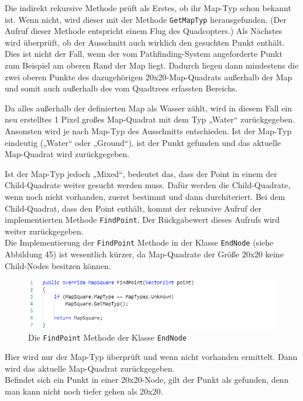 \documentclass[a4paper,12pt]{article}
\newcommand{\code}{\texttt}
\begin{document}
Die indirekt rekursive Methode prüft als Erstes, ob ihr Map-Typ schon bekannt ist. Wenn nicht, wird dieser mit der Methode \code{GetMapTyp} herausgefunden. (Der Aufruf dieser Methode entspricht einem Flug des Quadcopters.) Als Nächstes wird überprüft, ob der Ausschnitt auch wirklich den gesuchten Punkt enthält. Dies ist nicht der Fall, wenn der vom Pathfinding-System angeforderte Punkt zum Beispiel am oberen Rand der Map liegt. Dadurch liegen dann mindestens die zwei oberen Punkte des dazugehörigen 20x20-Map-Quadrats außerhalb der Map und somit auch außerhalb des vom Quadtrees erfassten Bereichs.

Da alles außerhalb der definierten Map als Wasser zählt, wird in diesem Fall ein neu erstelltes 1 Pixel großes Map-Quadrat mit dem Typ „Water“ zurückgegeben.
\\[0.4cm]
Ansonsten wird je nach Map-Typ des Ausschnitts entschieden. Ist der Map-Typ eindeutig („Water“ oder „Ground“), ist der Punkt gefunden und das aktuelle Map-Quadrat wird zurückgegeben.

Ist der Map-Typ jedoch „Mixed“, bedeutet das, dass der Point in einem der Child-Quadrate weiter gesucht werden muss. Dafür werden die Child-Quadrate, wenn noch nicht vorhanden, zuerst bestimmt und dann durchiteriert. Bei dem Child-Quadrat, dass den Point enthält, kommt der rekursive Aufruf der implementierten Methode \code{FindPoint}. Der Rückgabewert dieses Aufrufs wird weiter zurückgegeben.
\\[0.4cm]
Die Implementierung der \code{FindPoint} Methode in der Klasse \code{EndNode} (siehe Abbildung 45) ist wesentlich kürzer, da Map-Quadrate der Größe 20x20 keine Child-Nodes besitzen können.

\begin{figure}[H]
    \centering
    \includegraphics[width=1\linewidth]{Bilder/Aufgabe3/Quadtree_03.png}
    \caption{Die \code{FindPoint} Methode der Klasse \code{EndNode}}
\end{figure}

Hier wird nur der Map-Typ überprüft und wenn nicht vorhanden ermittelt. Dann wird das aktuelle Map-Quadrat zurückgegeben.
\\[0.4cm]
Befindet sich ein Punkt in einer 20x20-Node, gilt der Punkt als gefunden, denn man kann nicht noch tiefer gehen als 20x20.
\end{document}
